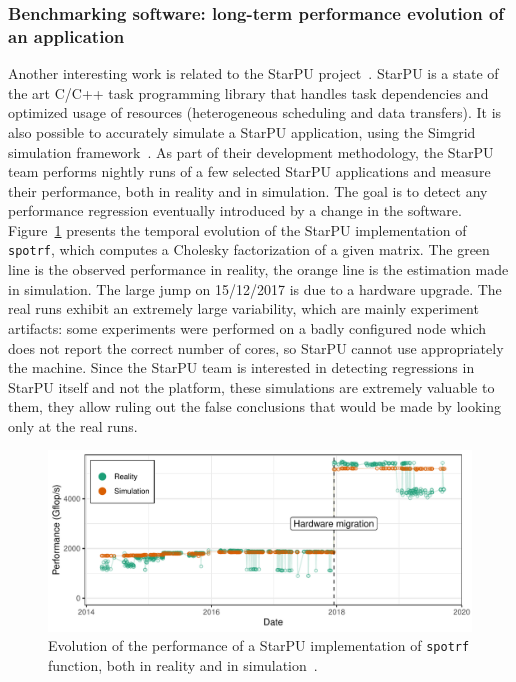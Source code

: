             \subsubsection{Benchmarking software: long-term performance evolution of an application}%

                Another interesting work is related to the StarPU project~\cite{AugThiNamWac11CCPE}. StarPU is a state
                of the art C/C++ task programming library that handles task dependencies and optimized usage of
                resources (heterogeneous scheduling and data transfers). It is also possible to accurately simulate a
                StarPU application, using the Simgrid simulation framework~\cite{stanisic:hal-01147997}. As part of
                their development methodology, the StarPU team performs nightly runs of a few selected StarPU
                applications and measure their performance, both in reality and in simulation. The goal is to detect any
                performance regression eventually introduced by a change in the software.
                Figure~\ref{fig:non_regression:state_of_art:starpu} presents the temporal evolution of the StarPU
                implementation of \texttt{spotrf}, which computes a Cholesky factorization of a given matrix. The green
                line is the observed performance in reality, the orange line is the estimation made in simulation. The
                large jump on 15/12/2017 is due to a hardware upgrade. The real runs exhibit an extremely large
                variability, which are mainly experiment artifacts: some experiments were performed on a badly
                configured node which does not report the correct number of cores, so StarPU cannot use appropriately
                the machine.  Since the StarPU team is interested in detecting regressions in StarPU itself and not the
                platform, these simulations are extremely valuable to them, they allow ruling out the false conclusions
                that would be made by looking only at the real runs.
                \begin{figure}[htpb]
                    \centering
                    \includegraphics[width=\linewidth]{img/experiment/non_regression/state_of_art/starpu_new.pdf}
                    \caption{Evolution of the performance of a StarPU implementation of \texttt{spotrf} function, both
                    in reality and in simulation~\cite{thibault:hal-02943753}.}%
                    \label{fig:non_regression:state_of_art:starpu}
                \end{figure}

